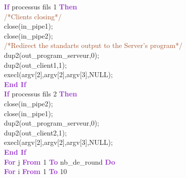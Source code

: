 \documentclass[11pt]{sample}
\renewcommand{\algorithmicdo}      {\textcolor{DarkOrchid}{\textbf{Do}}}
\renewcommand{\algorithmicif}      {\textbf{\textcolor{DarkOrchid}{If}}}
\renewcommand{\algorithmicendif}   {\textcolor{DarkOrchid}{\textbf{End If}}}
\renewcommand{\algorithmicthen}    {\textcolor{DarkOrchid}{\textbf{Then}}}
\renewcommand{\algorithmicfor}     {\textbf{\textcolor{DarkOrchid}{For}}}
\renewcommand{\algorithmicdo}      {\textbf{\textcolor{DarkOrchid}{Do}}}
\begin{document}
\begin{algorithm}
\begin{algorithmic}
    \algorithmicif{ processus fils 1 }\algorithmicthen{\\  \hspace{4mm}
      \textcolor{Sienna}{     /*Clients closing*/}\\
      \hspace{4mm}     close(in\_pipe1);\\
      \hspace{4mm}     close(in\_pipe2);\\
      \hspace{4mm}      \textcolor{Sienna}{     /*Redirect the standarts output to the Server's program*/}  \\
      \hspace{4mm}     dup2(out\_program\_serveur,0);\\
      \hspace{4mm}     dup2(out\_client1,1);\\
      \hspace{4mm}     execl(argv[2],argv[2],argv[3],NULL);\\}
    \algorithmicendif\\
    \algorithmicif{ processus fils 2 }\algorithmicthen{\\  \hspace{4mm}close(in\_pipe2);\\
      \hspace{4mm}  close(in\_pipe1);\\
      \hspace{4mm}   dup2(out\_program\_serveur,0);\\
      \hspace{4mm}   dup2(out\_client2,1);\\
      \hspace{4mm}    execl(argv[2],argv[2],argv[3],NULL);\\}
    \algorithmicendif\\
    \algorithmicfor{ j \textbf{\textcolor{DarkOrchid}{ From }} 1 \textbf{\textcolor{DarkOrchid}{ To}} nb\_de\_round }
    \algorithmicdo{\\}
    \hspace{4mm}
    \algorithmicfor{ i \textbf{\textcolor{DarkOrchid}{ From }} 1 \textbf{\textcolor{DarkOrchid}{ To}} 10 }

\end{algorithmic}
\end{algorithm}
\end{document}
